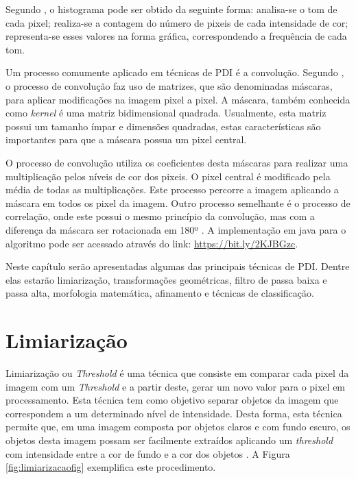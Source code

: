 \documentclass[
	12pt,				%
	oneside,			%
	a4paper,			%
	english,			%
	french,				%
	spanish,			%
	brazil,				%
	]{abntex2}
\begin{document}
Segundo \citet{conciAzevedoLeta:2008}, o histograma pode ser obtido da seguinte forma: analisa-se o tom de cada pixel; realiza-se a contagem do número de pixeis de cada intensidade de cor; representa-se esses valores na forma gráfica, correspondendo a frequência de cada tom.

Um processo comumente aplicado em técnicas de PDI é a convolução. Segundo \citet{pedriniSchwartz:2008}, o processo de convolução faz uso de matrizes, que são denominadas máscaras, para aplicar modificações na imagem pixel a pixel. A máscara, também conhecida como \textit{kernel} é uma matriz bidimensional quadrada. Usualmente, esta matriz possui um tamanho ímpar e dimensões quadradas, estas características são importantes para que a máscara possua um pixel central.

O processo de convolução utiliza os coeficientes desta máscaras para realizar uma multiplicação pelos níveis de cor dos pixeis. O pixel central é modificado pela média de todas as multiplicações. Este processo percorre a imagem aplicando a máscara em todos os pixel da imagem. Outro processo semelhante é o processo de correlação, onde este possui o mesmo princípio da convolução, mas com a diferença da máscara ser rotacionada em 180º \cite{gonzalesWoods:2008}. A implementação em java para o algoritmo pode ser acessado através do link: \url{https://bit.ly/2KJBGzc}.

Neste capítulo serão apresentadas algumas das principais técnicas de PDI. Dentre elas estarão limiarização, transformações geométricas, filtro de passa baixa e passa alta, morfologia matemática, afinamento e técnicas de classificação.
\section{Limiarização}
\label{sec:limiarizacao}

Limiarização ou \textit{Threshold} é uma técnica que consiste em comparar cada pixel da imagem com um \textit{Threshold} e a partir deste, gerar um novo valor para o pixel em processamento. Esta técnica tem como objetivo separar objetos da imagem que correspondem a um determinado nível de intensidade. Desta forma, esta técnica permite que, em uma imagem composta por objetos claros e com fundo escuro, os objetos desta imagem possam ser facilmente extraídos aplicando um \textit{threshold} com intensidade entre a cor de fundo e a cor dos objetos \cite{gonzalesWoods:2008}. A Figura \ref{fig:limiarizacaofig} exemplifica este procedimento.
\end{document}
